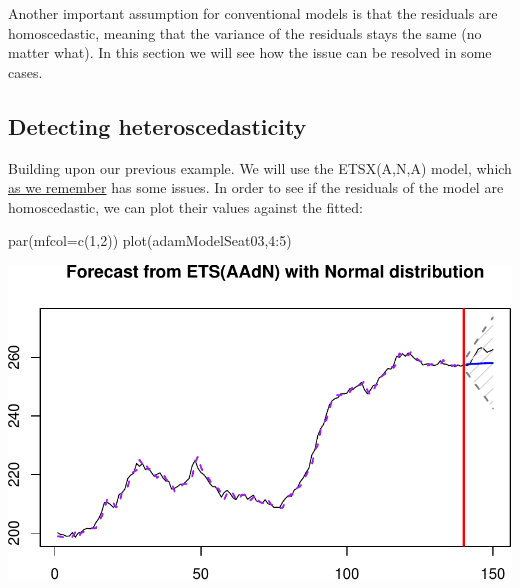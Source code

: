 \documentclass[
]{book}
\newenvironment{Shaded}{\begin{snugshade}}{\end{snugshade}}
\newcommand{\AttributeTok}[1]{\textcolor[rgb]{0.77,0.63,0.00}{#1}}
\newcommand{\DecValTok}[1]{\textcolor[rgb]{0.00,0.00,0.81}{#1}}
\newcommand{\FunctionTok}[1]{\textcolor[rgb]{0.00,0.00,0.00}{#1}}
\newcommand{\NormalTok}[1]{#1}
\newcommand{\SpecialCharTok}[1]{\textcolor[rgb]{0.00,0.00,0.00}{#1}}
\theoremstyle{definition}
\theoremstyle{definition}
\theoremstyle{definition}
\theoremstyle{definition}
\theoremstyle{remark}
\begin{document}
Another important assumption for conventional models is that the residuals are homoscedastic, meaning that the variance of the residuals stays the same (no matter what). In this section we will see how the issue can be resolved in some cases.

\hypertarget{detecting-heteroscedasticity}{%
\subsection{Detecting heteroscedasticity}\label{detecting-heteroscedasticity}}

Building upon our previous example. We will use the ETSX(A,N,A) model, which \protect\hyperlink{diagnosticsTransformations}{as we remember} has some issues. In order to see if the residuals of the model are homoscedastic, we can plot their values against the fitted:

\begin{Shaded}
\begin{Highlighting}[]
\FunctionTok{par}\NormalTok{(}\AttributeTok{mfcol=}\FunctionTok{c}\NormalTok{(}\DecValTok{1}\NormalTok{,}\DecValTok{2}\NormalTok{))}
\FunctionTok{plot}\NormalTok{(adamModelSeat03,}\DecValTok{4}\SpecialCharTok{:}\DecValTok{5}\NormalTok{)}
\end{Highlighting}
\end{Shaded}

\includegraphics{adam_files/figure-latex/unnamed-chunk-155-1.pdf}
\end{document}

